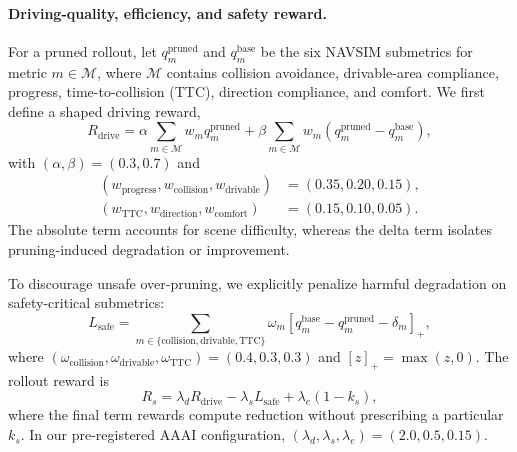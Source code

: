 \documentclass[letterpaper]{article} %
\begin{document}
\paragraph{Driving-quality, efficiency, and safety reward.}
For a pruned rollout, let $q_m^{\mathrm{pruned}}$ and
$q_m^{\mathrm{base}}$ be the six NAVSIM submetrics for metric
$m\in\mathcal{M}$, where $\mathcal{M}$ contains collision avoidance,
drivable-area compliance, progress, time-to-collision (TTC), direction
compliance, and comfort. We first define a shaped driving reward,
\begin{equation}
R_{\mathrm{drive}}=
\alpha\sum_{m\in\mathcal{M}}w_mq_m^{\mathrm{pruned}}
+\beta\sum_{m\in\mathcal{M}}w_m
\left(q_m^{\mathrm{pruned}}-q_m^{\mathrm{base}}\right),
\label{eq:driving-reward}
\end{equation}
with $(\alpha,\beta)=(0.3,0.7)$ and
\begin{equation}
\begin{aligned}
(w_{\mathrm{progress}},w_{\mathrm{collision}},w_{\mathrm{drivable}})
&= (0.35,0.20,0.15), \\
(w_{\mathrm{TTC}},w_{\mathrm{direction}},w_{\mathrm{comfort}})
&= (0.15,0.10,0.05).
\end{aligned}
\end{equation}
The absolute term accounts for scene difficulty, whereas the delta term
isolates pruning-induced degradation or improvement.

To discourage unsafe over-pruning, we explicitly penalize harmful degradation
on safety-critical submetrics:
\begin{equation}
L_{\mathrm{safe}} =
\sum_{m\in\{\mathrm{collision},\mathrm{drivable},\mathrm{TTC}\}}
\omega_m
\left[
q_m^{\mathrm{base}}-q_m^{\mathrm{pruned}}-\delta_m
\right]_+,
\label{eq:safety-loss}
\end{equation}
where
$(\omega_{\mathrm{collision}},\omega_{\mathrm{drivable}},
\omega_{\mathrm{TTC}})=(0.4,0.3,0.3)$ and
$[z]_+=\max(z,0)$. The rollout reward is
\begin{equation}
R_s =
\lambda_dR_{\mathrm{drive}}
-\lambda_sL_{\mathrm{safe}}
+\lambda_e(1-k_s),
\label{eq:total-reward}
\end{equation}
where the final term rewards compute reduction without prescribing a particular
$k_s$. In our pre-registered AAAI configuration,
$(\lambda_d,\lambda_s,\lambda_e)=(2.0,0.5,0.15)$.
\end{document}

